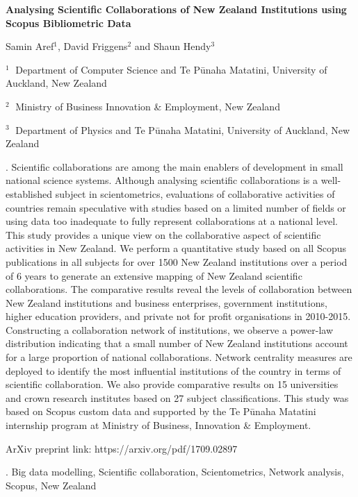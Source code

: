 \documentclass[12pt]{article}
\begin{document}
\begin{flushleft}


{\LARGE\bf Analysing Scientific Collaborations of New Zealand Institutions using Scopus Bibliometric Data}


\vspace{1.0cm}

Samin Aref$^1$, David Friggens$^2$ and Shaun Hendy$^3$

\begin{description}

\item $^1 \;$ Department of Computer Science and Te P\={u}naha Matatini, University of Auckland, New Zealand


\item $^2 \;$ Ministry of Business Innovation \& Employment, New Zealand


\item $^3 \;$ Department of Physics and Te P\={u}naha Matatini, University of Auckland, New Zealand


\end{description}

\end{flushleft}



. Scientific collaborations are among the main enablers of development in small national science systems. Although analysing scientific collaborations is a well-established subject in scientometrics, evaluations of collaborative activities of countries remain speculative with studies based on a limited number of fields or using data too inadequate to fully represent collaborations at a national level. This study provides a unique view on the collaborative aspect of scientific activities in New Zealand.
We perform a quantitative study based on all Scopus publications in all subjects for over 1500 New Zealand institutions over a period of 6 years to generate an extensive mapping of New Zealand scientific collaborations. The comparative results reveal the levels of collaboration between New Zealand institutions and business enterprises, government institutions, higher education providers, and private not for profit organisations in 2010-2015.
Constructing a collaboration network of institutions, we observe a power-law distribution indicating that a small number of New Zealand institutions account for a large proportion of national collaborations. Network centrality measures are deployed to identify the most influential institutions of the country in terms of scientific collaboration. We also provide comparative results on 15 universities and crown research institutes based on 27 subject classifications.
This study was based on Scopus custom data and supported by the Te Pūnaha Matatini internship program at Ministry of Business, Innovation \& Employment.

\noindent
ArXiv preprint link: https://arxiv.org/pdf/1709.02897


.
Big data modelling, Scientific collaboration, Scientometrics, Network analysis, Scopus, New Zealand
\end{document}
